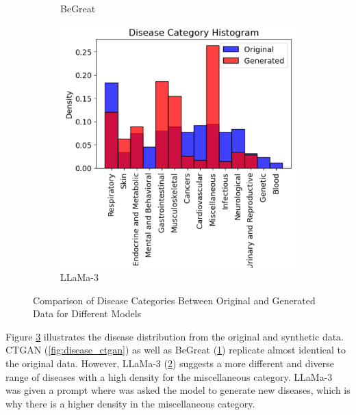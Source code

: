 \begin{figure}[H]
\begin{subfigure}[b]{0.45\textwidth}
        \caption{BeGreat}
        \label{fig:disease_begreat}
    \end{subfigure}
    \hfill
    \begin{subfigure}[b]{0.45\textwidth}
        \centering
        \includegraphics[width=\textwidth]{images/disease_llama.png}
        \caption{LLaMa-3}
        \label{fig:disease_llama}
    \end{subfigure}
    \caption{Comparison of Disease Categories Between Original and Generated Data for Different Models}
    \label{fig:disease_distrib}
\end{figure}

Figure \ref{fig:disease_distrib} illustrates the disease distribution from the original and synthetic data. CTGAN (\ref{fig:disease_ctgan}) as well as BeGreat (\ref{fig:disease_begreat}) replicate almost identical to the original data. However, LLaMa-3 (\ref{fig:disease_llama}) suggests a more different and diverse range of diseases with a high density for the miscellaneous category. LLaMa-3 was given a prompt where was asked the model to generate new diseases, which is why there is a higher density in the miscellaneous category.




